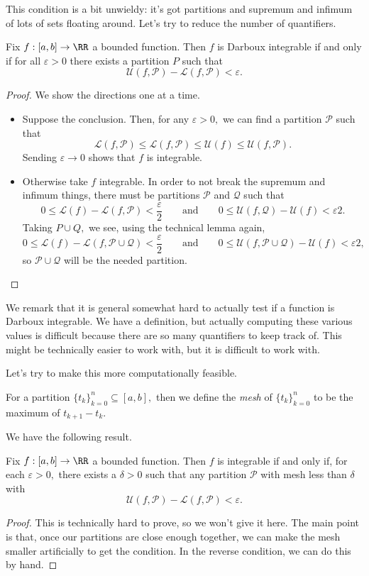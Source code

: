\documentclass[../notes.tex]{subfiles}
\begin{document}
This condition is a bit unwieldy: it's got partitions and supremum and infimum of lots of sets floating around. Let's try to reduce the number of quantifiers.
\begin{proposition}
	Fix $f:[a,b]\to\RR$ a bounded function. Then $f$ is Darboux integrable if and only if for all $\varepsilon>0$ there exists a partition $P$ such that
	\[\mathcal U(f,\mathcal P)-\mathcal L(f,\mathcal P)<\varepsilon.\]
\end{proposition}
\begin{proof}
	We show the directions one at a time.
	\begin{itemize}
		\item Suppose the conclusion. Then, for any $\varepsilon>0,$ we can find a partition $\mathcal P$ such that
		\[\mathcal L(f,\mathcal P)\le\mathcal L(f,\mathcal P)\le\mathcal U(f)\le\mathcal U(f,\mathcal P).\]
		Sending $\varepsilon\to0$ shows that $f$ is integrable.
		\item Otherwise take $f$ integrable. In order to not break the supremum and infimum things, there must be partitions $\mathcal P$ and $\mathcal Q$ such that
		\[0\le\mathcal L(f)-\mathcal L(f,\mathcal P)<\frac\varepsilon2\qquad\text{and}\qquad0\le\mathcal U(f,\mathcal Q)-\mathcal U(f)<\varepsilon2.\]
		Taking $P\cup Q,$ we see, using the technical lemma again,
		\[0\le\mathcal L(f)-\mathcal L(f,\mathcal P\cup\mathcal Q)<\frac\varepsilon2\qquad\text{and}\qquad0\le\mathcal U(f,\mathcal P\cup\mathcal Q)-\mathcal U(f)<\varepsilon2,\]
		so $\mathcal P\cup\mathcal Q$ will be the needed partition.
		\qedhere
	\end{itemize}
\end{proof}
We remark that it is general somewhat hard to actually test if a function is Darboux integrable. We have a definition, but actually computing these various values is difficult because there are so many quantifiers to keep track of. This might be technically easier to work with, but it is difficult to work with.

Let's try to make this more computationally feasible.
\begin{definition}
	For a partition $\{t_k\}_{k=0}^n\subseteq[a,b],$ then we define the \textit{mesh} of $\{t_k\}_{k=0}^n$ to be the maximum of $t_{k+1}-t_k.$
\end{definition}
We have the following result.
\begin{proposition}
	Fix $f:[a,b]\to\RR$ a bounded function. Then $f$ is integrable if and only if, for each $\varepsilon>0,$ there exists a $\delta>0$ such that any partition $\mathcal P$ with mesh less than $\delta$ with
	\[\mathcal U(f,\mathcal P)-\mathcal L(f,\mathcal P)<\varepsilon.\]
\end{proposition}
\begin{proof}
	This is technically hard to prove, so we won't give it here. The main point is that, once our partitions are close enough together, we can make the mesh smaller artificially to get the condition. In the reverse condition, we can do this by hand.
\end{proof}
\end{document}
